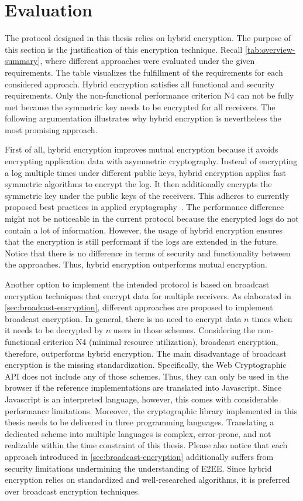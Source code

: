 \documentclass[../main.tex]{subfiles}
\begin{document}
\section{Evaluation}
\label{sec:justification}
The protocol designed in this thesis relies on hybrid encryption.
The purpose of this section is the justification of this encryption technique.
Recall \cref{tab:overview-summary}, where different approaches were evaluated under the given requirements.
The table visualizes the fulfillment of the requirements for each considered approach.
Hybrid encryption satisfies all functional and security requirements.
Only the non-functional performance criterion N4 can not be fully met because the symmetric key needs to be encrypted for all receivers.
The following argumentation illustrates why hybrid encryption is nevertheless the most promising approach.

First of all, hybrid encryption improves mutual encryption because it avoids encrypting application data with asymmetric cryptography.
Instead of encrypting a log multiple times under different public keys, hybrid encryption applies fast symmetric algorithms to encrypt the log.
It then additionally encrypts the symmetric key under the public keys of the receivers.
This adheres to currently proposed best practices in applied cryptography~\cite[340]{Eckert2018}.
The performance difference might not be noticeable in the current protocol because the encrypted logs do not contain a lot of information.
However, the usage of hybrid encryption ensures that the encryption is still performant if the logs are extended in the future.
Notice that there is no difference in terms of security and functionality between the approaches.
Thus, hybrid encryption outperforms mutual encryption.

Another option to implement the intended protocol is based on broadcast encryption techniques that encrypt data for multiple receivers.
As elaborated in \cref{sec:broadcast-encryption}, different approaches are proposed to implement broadcast encryption.
In general, there is no need to encrypt data $n$ times when it needs to be decrypted by $n$ users in those schemes.
Considering the non-functional criterion N4 (minimal resource utilization), broadcast encryption, therefore, outperforms hybrid encryption.
The main disadvantage of broadcast encryption is the missing standardization.
Specifically, the Web Cryptographic API does not include any of those schemes.
Thus, they can only be used in the browser if the reference implementations are translated into Javascript.
Since Javascript is an interpreted language, however, this comes with considerable performance limitations.
Moreover, the cryptographic library implemented in this thesis needs to be delivered in three programming languages.
Translating a dedicated scheme into multiple languages is complex, error-prone, and not realizable within the time constraint of this thesis.
Please also notice that each approach introduced in \cref{sec:broadcast-encryption} additionally suffers from security limitations undermining the understanding of E2EE.
Since hybrid encryption relies on standardized and well-researched algorithms, it is preferred over broadcast encryption techniques.
\end{document}
